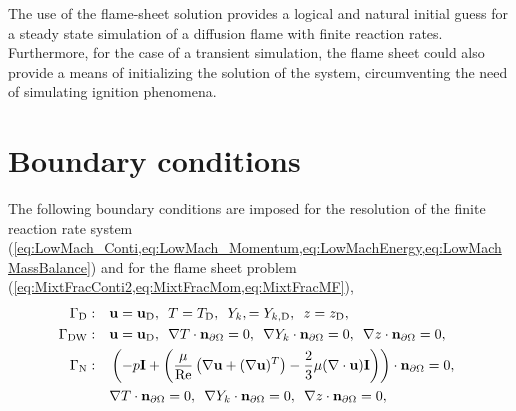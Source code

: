 The use of the flame-sheet solution provides a logical and natural initial guess for a steady state simulation of a diffusion flame with finite reaction rates.  Furthermore, for the case of a transient simulation, the flame sheet could also provide a means of initializing the solution of the system, circumventing the need of simulating ignition phenomena. 


\section{Boundary conditions}
The following boundary conditions are imposed for the resolution of the finite reaction rate system (\cref{eq:LowMach_Conti,eq:LowMach_Momentum,eq:LowMachEnergy,eq:LowMachMassBalance}) and for the flame sheet problem (\cref{eq:MixtFracConti2,eq:MixtFracMom,eq:MixtFracMF}),
\begin{subequations}
	\begin{align}
		\Gamma_{\text{D}}:\quad
		 & \vec{u} = \vec{u}_{\text{D}},
		\,\,\,
		T = T_{\text{D}},
		\,\,\,
		Y_{k}, =Y_{k,{\text{D}}},
		\,\,\,
		z = z_{\text{D}},
		\label{eq:bc_d}                                                                                                                                                                                             \\
		\Gamma_{{\text{DW}}}:\quad
		 & \vec{u} = \vec{u}_{\text{D}},
		\,\,\,
		\nabla T \cdot \vec{n}_{\partial \Omega} = 0,
		\,\,\,
		\nabla Y_{k} \cdot  \vec{n}_{\partial \Omega}= 0,
		\,\,\,
		\nabla z \cdot \vec{n}_{\partial \Omega} = 0,
		\label{eq:bc_dn}                                                                                                                                                                                            \\
		\Gamma_{\text{N}}: \quad
		 & \left( -p \mathbf{I}	+ \left(\frac{\mu}{\Reynolds} \left(\nabla \vec{u} + (\nabla \vec{u})^T\right) - \frac{2}{3}\mu(\nabla \cdot \vec{u})\mathbf{I}\right)\right)\cdot  \vec{n}_{\partial \Omega} 	= 0,
		\,\,\,\notag                                                                                                                                                                                                \\
		 &
		\nabla T \cdot \vec{n}_{\partial \Omega} = 0,
		\,\,\,
		\nabla  Y_{k} \cdot \vec{n}_{\partial \Omega}= 0,
		\,\,\,
		\nabla z \cdot \vec{n}_{\partial \Omega} = 0,
		\label{eq:bc_O}                                                                                                                                                                                             \\

\end{align}
\end{subequations}
